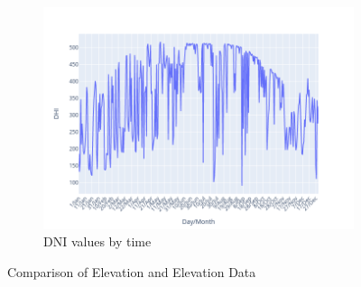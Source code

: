 \documentclass[letterpaper]{article}
\begin{document}
\begin{figure}[h]
\begin{subfigure}{0.49\textwidth}
        \includegraphics[width=1\textwidth]{DHI}
        \caption{DNI values by time}\label{fig: Direct Normal Irradiance}
    \end{subfigure}
    \caption{Comparison of Elevation and Elevation Data}
\end{figure}



\end{document}
